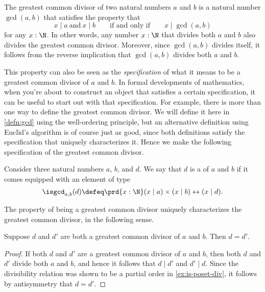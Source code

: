 The greatest common divisor of two natural numbers $a$ and $b$ is a natural number $\gcd(a,b)$ that satisfies the property that
\begin{equation*}
  x\mid a\ \text{and}\ x\mid b\qquad\text{if and only if}\qquad x\mid\gcd(a,b)
\end{equation*}
for any $x:\N$. In other words, any number $x:\N$ that divides both $a$ and $b$ also divides the greatest common divisor. Moreover, since $\gcd(a,b)$ divides itself, it follows from the reverse implication that $\gcd(a,b)$ divides both $a$ and $b$.

This property can also be seen as the \emph{specification} of what it means to be a greatest common divisor of $a$ and $b$. In formal developments of mathematics, when you're about to construct an object that satisfies a certain specification, it can be useful to start out with that specification. For example, there is more than one way to define the greatest common divisor. We will define it here in \cref{defn:gcd} using the well-ordering principle, but an alternative definition using Euclid's algorithm is of course just as good, since both definitions satisfy the specification that uniquely characterizes it. Hence we make the following specification of the greatest common divisor.

\begin{defn}\label{defn:is-gcd}
  Consider three natural numbers $a$, $b$, and $d$. We say that $d$ is a  of $a$ and $b$ if it comes equipped with an element of type
  \begin{equation*}
    \isgcd_{a,b}(d) \defeq \prd{x:\N} (x\mid a)\times (x\mid b)\leftrightarrow (x\mid d).
  \end{equation*}
\end{defn}

The property of being a greatest common divisor uniquely characterizes the greatest common divisor, in the following sense.

\begin{prp}
  Suppose $d$ and $d'$ are both a greatest common divisor of $a$ and $b$. Then $d=d'$.
\end{prp}

\begin{proof}
  If both $d$ and $d'$ are a greatest common divisor of $a$ and $b$, then both $d$ and $d'$ divide both $a$ and $b$, and hence it follows that $d\mid d'$ and $d'\mid d$. Since the divisibility relation was shown to be a partial order in \cref{ex:is-poset-div}, it follows by antisymmetry that $d=d'$.
\end{proof}

